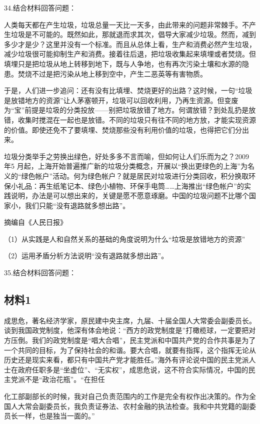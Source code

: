 \documentclass[UTF8,11pt]{ctexart}
\begin{document}
34.结合材料回答问题：

人类每天都在产生垃圾，垃圾总量一天比一天多，由此带来的问题非常棘手。不产生垃圾是不可能的。既然如此，那就退而求其次，倡导大家减少垃圾。然而，减到多少才是少？这里并没有一个标准。而且从总体上看，生产和消费必然产生垃圾，减少垃圾很可能抑制生产和消费。接着往后退，把垃圾收集起来填埋或者焚烧。但填埋只是把垃圾从地上转移到地下，既与人争地，也有再次污染土壤和水源的隐患。焚烧不过是把污染从地上移到空中，产生二恶英等有害物质。

于是，人们进一步追问：还有没有比填埋、焚烧更好的出路？这时候，一句“垃圾是放错地方的资源”让人茅塞顿开，垃圾可以回收利用，乃再生资源。但变废为“宝”前提是垃圾的分类投放——别把垃圾放错了地方。何谓放错？到处乱扔是放错，收集时搅混在一起也是放错。不同的垃圾只有往不同的地方放，才能实现资源的价值。即使还免不了要填埋、焚烧那些没有利用价值的垃圾，也得把它们分出来。

垃圾分类举手之劳换出绿色，好处多多不言而喻，但如何让人们乐而为之？2009 年5 月起，上海开始普遍推广新的垃圾分类概念，开展以“换出更绿色的上海”为名义的“绿色帐户”活动。何为绿色帐户？就是居民对垃圾进行分类回收，积分换取环保小礼品：再生纸笔记本、绿色小植物、环保手电筒……上海推出“绿色帐户”的实践说明，办法是可以想出来的，关键是愿不愿意琢磨。中国的垃圾问题不比哪个国家小，我们只能“没有退路就多想出路”。

摘编自《人民日报》

（1）从实践是人和自然关系的基础的角度说明为什么“垃圾是放错地方的资源”


（2）运用矛盾分析方法说明“没有退路就多想出路”。


35.结合材料回答问题：


\subsection*{材料1}

成思危，著名经济学家，原民建中央主席，九届、十届全国人大常委会副委员长。谈到我国政党制度，他深有体会地说：“西方的政党制度是”打橄榄球，一定要把对方压倒。我们的政党制度是“唱大合唱”，民主党派和中国共产党的合作共事是为了一个共同的目标，为了保持社会的和谐。要大合唱，就要有指挥，这个指挥无论从历史还是现实来看，都只有中国共产党才能胜任。”海外有评论说中国的民主党派人士在政府任职多是“坐虚位”、“无实权”，成思危说，这不符合实际情况，中国的民主党派不是“政治花瓶”。“在担任


化工部副部长的时候，我对自己负责范围内的工作是完全有权作出决策的。作为全国人大常会副委员长，我负责证券法、农村金融的执法检查。我和中共党籍的副委员长一样，也是独当一面的。”
\end{document}
